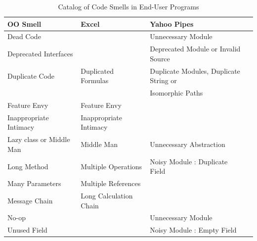 \documentclass{sig-alternate}
\renewcommand*\cmidrule{\midrule[0.001em]} %
\newcommand{\todo}[1]{\textbf{TODO: #1}}
\begin{document}
\begin{table}
\caption{Catalog of Code Smells in End-User Programs
\label{table:oosmellslarge}}
\centering
\sffamily
\begin{tabular} {@{}llll@{}}
\toprule
\textbf{OO Smell}
	& \textbf{Excel}
	& \textbf{Yahoo Pipes}
\\ \midrule
Dead Code
	& %
	& Unnecessary Module \cite{StoleeTSE2013}
\\ \cmidrule
Deprecated Interfaces
	& %
	& Deprecated Module or Invalid Source \cite{StoleeTSE2013}

\\ \cmidrule
Duplicate Code
	& Duplicated Formulas \cite{Hermans2012intra}
	& Duplicate Modules, Duplicate String or
\\ %
& 
& Isomorphic Paths \cite{StoleeTSE2013}
\\ \cmidrule
Feature Envy
	& Feature Envy \cite{Hermans2012inter}
	& %
\\ \cmidrule
Inappropriate Intimacy
	& Inappropriate Intimacy \cite{Hermans2012inter}
	& %
\\ \cmidrule
Lazy class or Middle Man
	& Middle Man \cite{Hermans2012inter}
	& Unnecessary Abstraction \cite{StoleeTSE2013}
\\ \cmidrule
Long Method
	& Multiple Operations \cite{Hermans2012intra}
	& Noisy Module : Duplicate Field \cite{StoleeTSE2013}
\\ \cmidrule
Many Parameters
	& Multiple References \cite{Hermans2012intra}
	& 
\\ \cmidrule
Message Chain
	& Long Calculation Chain \cite{Hermans2012intra}
	& 
\\ \cmidrule
No-op
	& %
	& Unnecessary Module \cite{StoleeTSE2013}
\\ \cmidrule
Unused Field
	& %
	& Noisy Module : Empty Field \cite{StoleeTSE2013}
\\ \bottomrule
\end{tabular}
\end{table}
\end{document}

